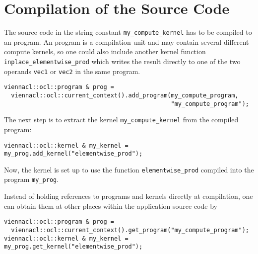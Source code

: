 \section{Compilation of the Source Code}
The source code in the string constant \lstinline{my_compute_kernel} has to be compiled to an {\OpenCL} program.
An {\OpenCL} program is a compilation unit and may contain several different compute kernels,
so one could also include another kernel function \lstinline{inplace_elementwise_prod} which writes the result directly to one of the two operands \lstinline{vec1} or \lstinline{vec2} in the same program.
\begin{lstlisting}
viennacl::ocl::program & prog = 
  viennacl::ocl::current_context().add_program(my_compute_program,
                                               "my_compute_program");
\end{lstlisting}
The next step is to extract the kernel \lstinline|my_compute_kernel| from the compiled program:
\begin{lstlisting}
viennacl::ocl::kernel & my_kernel = my_prog.add_kernel("elementwise_prod");
\end{lstlisting}
Now, the kernel is set up to use the function \lstinline|elementwise_prod| compiled into the program \lstinline|my_prog|.


Instead of holding references to programs and kernels directly at compilation, one can obtain them at other places within the application source code by
\begin{lstlisting}
viennacl::ocl::program & prog = 
  viennacl::ocl::current_context().get_program("my_compute_program");
viennacl::ocl::kernel & my_kernel = my_prog.get_kernel("elementwise_prod");
\end{lstlisting}

